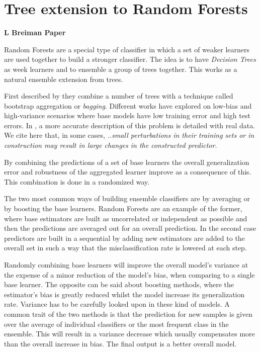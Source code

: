 \section{Tree extension to Random Forests}
\textbf{L Breiman Paper}\cite{breiman-randomforests}

Random Forests are a special type of classifier in which a set of weaker learners are used together to build a stronger classifier. The idea is to have \textit{Decision Trees} as week learners and to ensemble a group of trees together. This works as a natural ensemble extension from trees.

 First described by \cite{HoFirstRandomForest} they combine a number of trees with a technique called bootstrap aggregation or \textit{bagging}. Different works have explored on low-bias and high-variance scenarios where base models have low training error and high test errors. In \cite{breiman-arcingclassifiers}, a more accurate description of this problem is detailed with  real data. We cite here that, in some cases, \textit{..small perturbations in their  training  sets  or  in  construction  may  result  in  large  changes  in  the  constructed  predictor}.

By combining the predictions of a set of base learners the overall generalization error and robustness of the aggregated learner improve as a consequence of this. This combination is done in a randomized way.

The two most common ways of building ensemble classifiers are by averaging or by boosting the base learners. Random Forests are an example of the former, where base estimators are built as uncorrelated or independent as possible and then the predictions are averaged out for an overall prediction. In the second case predictors are built in a sequential by adding new estimators are added to the overall set in such a way that the misclassification rate is lowered at each step.

Randomly combining base learners will improve the overall model's variance at the expense of a minor reduction of the model's bias, when comparing to a single base learner. The opposite can be said about boosting methods, where the estimator's bias is greatly reduced whilst the model increase its generalization rate. Variance has to be carefully looked upon in these kind of models. A common trait of the two methods is that the prediction for new samples is given over the average of individual classifiers or the most frequent class in the ensemble.   This will result in a variance decrease which usually compensates more than the overall increase in bias. The final output is a better overall model. 

